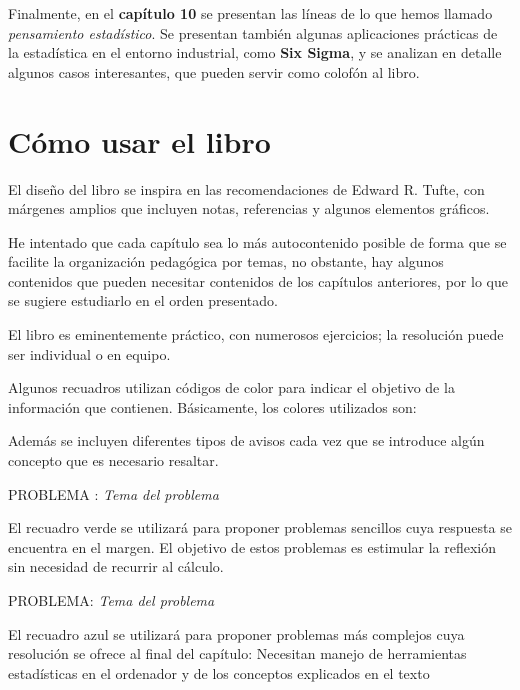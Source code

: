 \documentclass[
  letterpaper,
]{scrbook}
\begin{document}
Finalmente, en el \textbf{capítulo 10} se presentan las líneas de lo que
hemos llamado \emph{pensamiento estadístico}. Se presentan también
algunas aplicaciones prácticas de la estadística en el entorno
industrial, como \textbf{Six Sigma}, y se analizan en detalle algunos
casos interesantes, que pueden servir como colofón al libro.

\hypertarget{cuxf3mo-usar-el-libro}{%
\section*{Cómo usar el libro}\label{cuxf3mo-usar-el-libro}}

El diseño del libro se inspira en las recomendaciones de Edward R.
Tufte, con márgenes amplios que incluyen notas, referencias y algunos
elementos gráficos.

He intentado que cada capítulo sea lo más autocontenido posible de forma
que se facilite la organización pedagógica por temas, no obstante, hay
algunos contenidos que pueden necesitar contenidos de los capítulos
anteriores, por lo que se sugiere estudiarlo en el orden presentado.

El libro es eminentemente práctico, con numerosos ejercicios; la
resolución puede ser individual o en equipo.

Algunos recuadros utilizan códigos de color para indicar el objetivo de
la información que contienen. Básicamente, los colores utilizados son:

{}

Además se incluyen diferentes tipos de avisos cada vez que se introduce
algún concepto que es necesario resaltar.

\begin{cajaverde}{ PROBLEMA : \emph{Tema del problema}}

El recuadro verde se utilizará para proponer problemas sencillos cuya respuesta se encuentra en el margen. El objetivo de estos problemas es estimular la reflexión sin necesidad de recurrir al cálculo.

\end{cajaverde}

\begin{cajaazul}{ PROBLEMA: \emph{Tema del problema}}

El recuadro azul se utilizará para proponer problemas más complejos cuya resolución se ofrece al final del capítulo: Necesitan manejo de herramientas estadísticas en el ordenador y de los conceptos explicados en el texto

\end{cajaazul}
\end{document}
